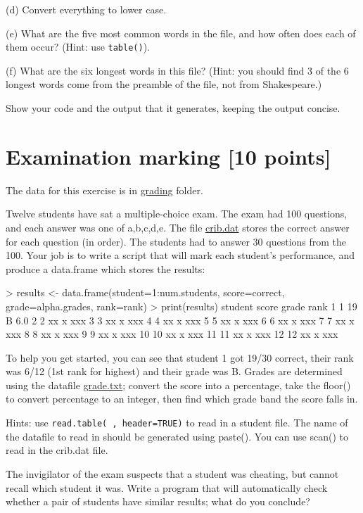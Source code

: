 \documentclass[11pt]{article}\usepackage[]{graphicx}\usepackage[]{color}
\newcommand{\ri}[1]{\lstinline{#1}}  %
\begin{document}
(d) Convert everything to lower case.

(e) What are the five most common words in the file, and how often does each of
them occur?  (Hint: use \verb+table()+).


(f) What are the six longest words in this file?  (Hint: you should
find 3 of the 6 longest words come from the preamble of the file, not
from Shakespeare.)

Show your code and the output that it generates, keeping the output
concise.


\section{Examination marking [10 points]}
The data for this exercise is in \url{grading} folder.

Twelve students have sat a multiple-choice exam.  The exam had 100
questions, and each answer was one of a,b,c,d,e.  The file \url{crib.dat}
stores the correct answer for each question (in order).  The students
had to answer 30 questions from the 100.  Your job is to write a
script that will mark each student's performance, and produce a
data.frame which stores the results:

\begin{rc}
> results <- data.frame(student=1:num.students, score=correct,
                        grade=alpha.grades, rank=rank)
> print(results)
   student score grade rank
1        1    19     B  6.0
2        2    xx     x  xxx
3        3    xx     x  xxx
4        4    xx     x  xxx
5        5    xx     x  xxx
6        6    xx     x  xxx
7        7    xx     x  xxx
8        8    xx     x  xxx
9        9    xx     x  xxx
10      10    xx     x  xxx
11      11    xx     x  xxx
12      12    xx     x  xxx
\end{rc}


To help you get started, you can see that student 1 got 19/30 correct,
their rank was 6/12 (1st rank for highest) and their grade was B.
Grades are determined using the datafile \url{grade.txt}; convert the score
into a percentage, take the floor() to convert percentage to an
integer, then find which grade band the score falls in.


Hints: use \ri{read.table( , header=TRUE)} to read in a student file.  The
name of the datafile to read in should be generated using paste().
You can use scan() to read in the crib.dat file.



The invigilator of the exam suspects that a student was cheating, but
cannot recall which student it was.  Write a program that will
automatically check whether a pair of students have similar results;
what do you conclude?
\end{document}
